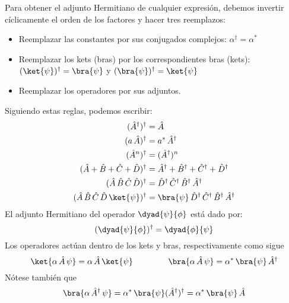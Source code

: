 Para obtener el adjunto Hermitiano de cualquier expresión, debemos invertir cíclicamente el orden de los factores y hacer tres reemplazos:
\begin{itemize}
\item Reemplazar las constantes por sus conjugados complejos: $\alpha^{\dagger} = \alpha^{*}$
\item Reemplazar los kets (bras) por los correspondientes bras (kets): $(\ket{\psi})^{\dagger} = \bra{\psi}$ y $(\bra{\psi})^{\dagger} = \ket{\psi}$
\item Reemplazar los operadores por sus adjuntos.
\end{itemize}
Siguiendo estas reglas, podemos escribir:
\begin{align}
(\hat{A}^{\dagger})^{\dagger} &= \hat{A} \label{eq:ecuacion_02_61} \\
(a \, \hat{A})^{\dagger} &= a^{*} \, \hat{A}^{\dagger} \label{eq:ecuacion_02_62} \\
(\hat{A}^{n})^{\dagger} &= (\hat{A}^{\dagger})^{n} \label{eq:ecuacion_02_63} \\
(\hat{A} + \hat{B} + \hat{C} + \hat{D})^{\dagger} &= \hat{A}^{\dagger} + \hat{B}^{\dagger} + \hat{C}^{\dagger} + \hat{D}^{\dagger} \label{eq:ecuacion_02_64} \\
(\hat{A} \, \hat{B} \, \hat{C} \, \hat{D})^{\dagger} &= \hat{D}^{\dagger} \, \hat{C}^{\dagger} \, \hat{B}^{\dagger} \, \hat{A}^{\dagger} \label{eq:ecuacion_02_65} \\
(\hat{A} \, \hat{B} \, \hat{C} \, \hat{D} \, \ket{\psi})^{\dagger} &= \bra{\psi} \, \hat{D}^{\dagger} \, \hat{C}^{\dagger} \, \hat{B}^{\dagger} \, \hat{A}^{\dagger} \label{eq:ecuacion_02_66}
\end{align}
El adjunto Hermitiano del operador $\dyad{\psi}{\phi}$ está dado por:
\begin{equation}
(\dyad{\psi}{\phi})^{\dagger} = \dyad{\phi}{\psi}
\label{eq:ecuacion_02_67}
\end{equation}
Los operadores actúan dentro de los kets y bras, respectivamente como sigue
\begin{equation}
\ket{\alpha \, \hat{A} \, \psi} = \alpha \, \hat{A} \, \ket{\psi} \hspace{1.5cm} \bra{\alpha \, \hat{A} \, \psi} = \alpha^{*} \, \bra{\psi} \, \hat{A}^{\dagger} \label{eq:ecuacion_02_68}
\end{equation}
Nótese también que
\begin{align*}
\bra{\alpha \, \hat{A}^{\dagger} \, \psi} = \alpha^{*} \, \bra{\psi} (\hat{A}^{\dagger})^{\dagger} = \alpha^{*} \, \bra{\psi} \, \hat{A}
\end{align*}
